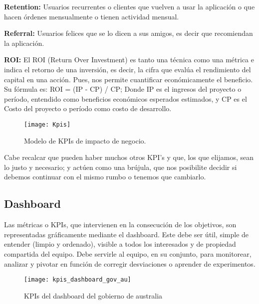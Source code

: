 \begin{description}
  \item {\textbf{Retention:} Usuarios recurrentes o clientes que vuelven a usar la aplicación o que hacen órdenes mensualmente o tienen actividad mensual.
}

  \item {\textbf{Referral:} Usuarios felices que se lo dicen a sus amigos, es decir que recomiendan la aplicación.
}

  \item {\textbf{ROI:} El ROI (Return Over Investment) es tanto una técnica como una métrica e indica el retorno de una inversión, es decir, la cifra que evalúa el rendimiento del capital en una acción. Pues, nos permite cuantificar económicamente el beneficio. Su fórmula es: ROI = (IP - CP) / CP; Donde IP es el ingresos del proyecto o período, entendido como beneficios económicos esperados estimados, y CP es el Costo del proyecto o período como costo de desarrollo.
}

\end{description}

\begin{figure}[h]
  \centering
  \texttt{[image: Kpis]}
  \caption{Modelo de KPIs de impacto de negocio.}
  \centering
  \label{fig:Kpis} %
\end{figure}
\FloatBarrier %


Cabe recalcar que pueden haber muchos otros KPI’s y que, los que elijamos, sean lo justo y necesario; y actúen como una brújula, que nos posibilite decidir si debemos continuar con el mismo rumbo o tenemos que cambiarlo.

\subsection{Dashboard}

Las métricas o KPIs, que intervienen en la consecución de los objetivos, son representadas gráficamente mediante el dashboard. Este debe ser útil, simple de entender (limpio y ordenado), visible a todos los interesados y de propiedad compartida del equipo. Debe servirle al equipo, en su conjunto, para monitorear, analizar y pivotar en función de corregir desviaciones o aprender de experimentos.

  \begin{figure}[h]
  \centering
  \texttt{[image: kpis\_dashboard\_gov\_au]}
  \caption{KPIs del dashboard del gobierno de australia}
  \centering
  \label{fig:kpis_dashboard_gov_au} %
  \end{figure}
  \FloatBarrier

